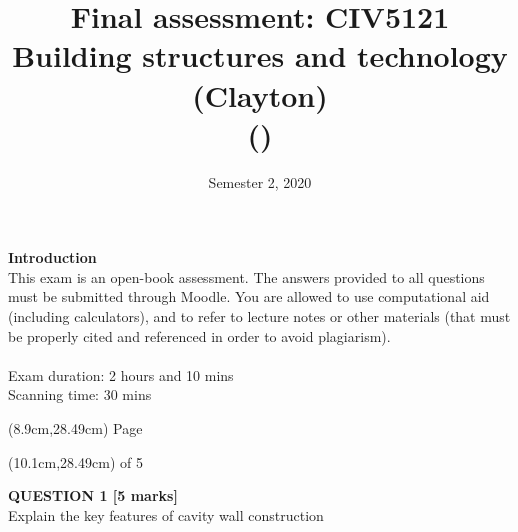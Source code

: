\documentclass[a4paper,11pt]{article}
\title{Final assessment: CIV5121 Building structures and technology (Clayton)\\
\VAR{FullName} (\VAR{StudentID})}
\date{Semester 2, 2020}
\begin{document}
\maketitle

\begin{introduction}	
\noindent
\textbf{Introduction}\\
\noindent
This exam is an open-book assessment. The answers provided to all questions must be submitted through Moodle. You are allowed to use computational aid (including calculators), and to refer to lecture notes or other materials (that must be properly cited and referenced in order to avoid plagiarism).\\
\\ 
\noindent
Exam duration: 2 hours and 10 mins\\
\noindent
Scanning time: 30 mins\\

\end{introduction}
\begin{textblock*}{5cm}(8.9cm,28.49cm)
Page
\end{textblock*}
\begin{textblock*}{5cm}(10.1cm,28.49cm)
of 5
\end{textblock*}
\newpage
\noindent
\textbf{QUESTION 1 [5 marks]}\\
Explain the key features of cavity wall construction\\
\\
\\
\end{document}

